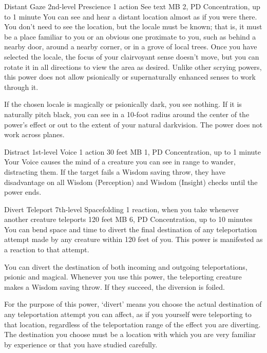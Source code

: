   \DndPowerHeader%
  {Distant Gaze}
  {2nd-level Prescience}
  {1 action}
  {See text}
  {MB 2, PD \lvltwo}
  {Concentration, up to 1 minute}
  You can see and hear a distant location
  almost as if you were there.
  You don't need to see the location,
  but the locale must be known;
  that is, it must be
  a place familiar to you or an obvious one
  proximate to you,
  such as behind a nearby door,
  around a nearby corner,
  or in a grove of local trees.
  Once you have selected the locale,
  the focus of your clairvoyant sense doesn't move,
  but you can rotate it in all directions
  to view the area as desired.
  Unlike other scrying powers,
  this power does not allow psionically or supernaturally
  enhanced senses to work through it.

  If the chosen locale is magically or psionically dark,
  you see nothing.
  If it is naturally pitch black,
  you can see in a 10-foot radius around the center
  of the power's effect or out to the extent
  of your natural darkvision.
  The power does not work across planes.

\DndPowerHeader%
  {Distract}
  {1st-level Voice}
  {1 action}
  {30 feet}
  {MB 1, PD \lvlone}
  {Concentration, up to 1 minute}
Your Voice causes the mind of a creature you can see
in range to wander, distracting them.
If the target fails a Wisdom saving throw,
they have disadvantage on all Wisdom (Perception)
and Wisdom (Insight) checks until the power ends.

\DndPowerHeader%
  {Divert Teleport}
  {7th-level Spacefolding}
  {1 reaction, when you take whenever another creature
  teleports}
  {120 feet}
  {MB 6, PD \lvlseven}
  {Concentration, up to 10 minutes}
  You can bend space and time to
  divert the final destination of any teleportation attempt
  made by any creature within 120 feet of you.
  This power is manifested as a reaction to that attempt.

  You can divert the destination of both incoming and outgoing
  teleportations,
  psionic and magical.
  Whenever you use this power,
  the teleporting creature makes a Wisdom saving throw.
  If they succeed, the diversion is foiled.
  
  For the purpose of this power,
  `divert' means you choose the actual destination
  of any teleportation attempt you can affect,
  as if you yourself were teleporting to that location,
  regardless of the teleportation range
  of the effect you are diverting.
  The destination you choose must be a location
  with which you are very familiar by experience
  or that you have studied carefully.
  
